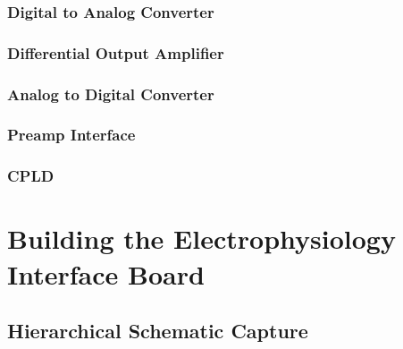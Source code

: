 \documentclass{article}
\begin{document}
\subsubsection{Digital to Analog Converter}\label{sec:dac}



\subsubsection{Differential Output Amplifier}\label{sec:DOA}



\subsubsection{Analog to Digital Converter}\label{sec:adc}



\subsubsection{Preamp Interface}\label{sec:preamp}



\subsubsection{CPLD}\label{sec:cpld}




\section{Building the Electrophysiology Interface Board}\label{sec:build}



\subsection{Hierarchical Schematic Capture}
\end{document}
